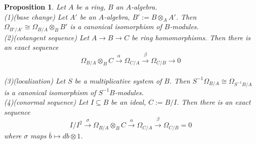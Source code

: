 \documentclass{ctexart}
\newtheorem{proposition}{Proposition}[section]
\begin{document}
\begin{proposition}
    Let $A$ be a ring, $B$ an $A$-algebra. \\
    (1)(base change) 
    Let $A'$ be an $A$-algebra, $B' := B \otimes_{A} A'$.
    Then $\Omega_{B'/A'} \cong \Omega_{B/A} \otimes_{B} B'$ is a canonical isomorphism of $B$-modules. \\
    (2)(cotangent sequence) 
    Let $A \longrightarrow B \longrightarrow C$ be ring homomorphisms.
    Then there is an exact sequence
    \begin{equation*}
        \Omega_{B/A} \otimes_{B} C \overset{\alpha}{\longrightarrow} \Omega_{C/A} \overset{\beta}{\longrightarrow} \Omega_{C/B} \longrightarrow 0
    \end{equation*}
    \\
    (3)(localization)
    Let $S$ be a multiplicative system of $B$.
    Then $S^{-1}\Omega_{B/A} \cong \Omega_{S^{-1}B/A}$ is a canonical isomorphism of $S^{-1}B$-modules. \\
    (4)(conormal sequence)
    Let $I \subseteq B$ be an ideal, $C := B/I$.
    Then there is an exact sequence
    \begin{equation*}
        I/I^{2} \overset{\sigma}{\longrightarrow} \Omega_{B/A} \otimes_{B} C \overset{\alpha}{\longrightarrow} \Omega_{C/A} \overset{\beta}{\longrightarrow} \Omega_{C/B} = 0
    \end{equation*} 
    where $\sigma$ maps $\overline{b} \longmapsto db \otimes 1$.
    \label{Proposition 9.1}
\end{proposition}
\end{document}
